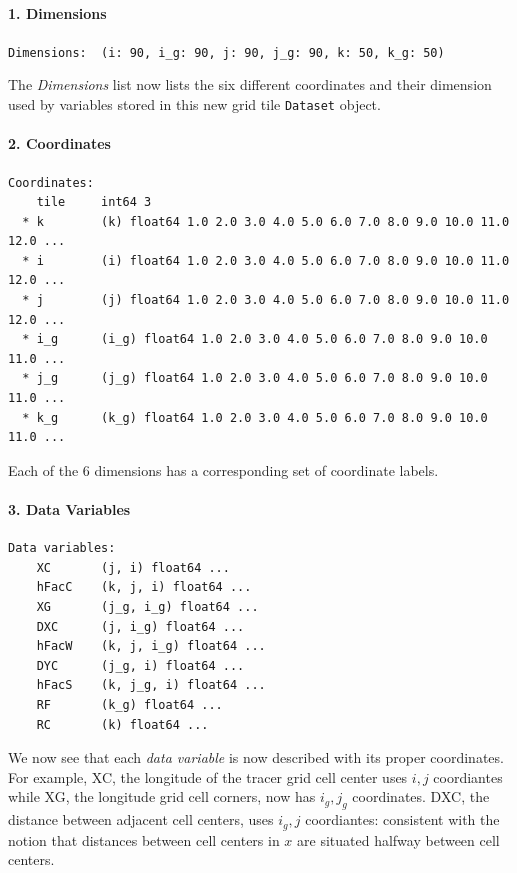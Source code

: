 \documentclass[11pt]{article}
\begin{document}
\paragraph{1. Dimensions}\label{dimensions}

\texttt{Dimensions:\ \ (i:\ 90,\ i\_g:\ 90,\ j:\ 90,\ j\_g:\ 90,\ k:\ 50,\ k\_g:\ 50)}

The \emph{Dimensions} list now lists the six different coordinates and
their dimension used by variables stored in this new grid tile
\texttt{Dataset} object.

\paragraph{2. Coordinates}\label{coordinates}

\begin{verbatim}
Coordinates:
    tile     int64 3
  * k        (k) float64 1.0 2.0 3.0 4.0 5.0 6.0 7.0 8.0 9.0 10.0 11.0 12.0 ...
  * i        (i) float64 1.0 2.0 3.0 4.0 5.0 6.0 7.0 8.0 9.0 10.0 11.0 12.0 ...
  * j        (j) float64 1.0 2.0 3.0 4.0 5.0 6.0 7.0 8.0 9.0 10.0 11.0 12.0 ...
  * i_g      (i_g) float64 1.0 2.0 3.0 4.0 5.0 6.0 7.0 8.0 9.0 10.0 11.0 ...
  * j_g      (j_g) float64 1.0 2.0 3.0 4.0 5.0 6.0 7.0 8.0 9.0 10.0 11.0 ...
  * k_g      (k_g) float64 1.0 2.0 3.0 4.0 5.0 6.0 7.0 8.0 9.0 10.0 11.0 ...
\end{verbatim}

Each of the 6 dimensions has a corresponding set of coordinate labels.

\paragraph{3. Data Variables}\label{data-variables}

\begin{verbatim}
Data variables:
    XC       (j, i) float64 ...
    hFacC    (k, j, i) float64 ...
    XG       (j_g, i_g) float64 ...
    DXC      (j, i_g) float64 ...
    hFacW    (k, j, i_g) float64 ...
    DYC      (j_g, i) float64 ...
    hFacS    (k, j_g, i) float64 ...
    RF       (k_g) float64 ...
    RC       (k) float64 ...
\end{verbatim}

We now see that each \emph{data variable} is now described with its
proper coordinates. For example, XC, the longitude of the tracer grid
cell center uses \(i,j\) coordiantes while XG, the longitude grid cell
corners, now has \(i_g, j_g\) coordinates. DXC, the distance between
adjacent cell centers, uses \(i_g, j\) coordiantes: consistent with the
notion that distances between cell centers in \(x\) are situated halfway
between cell centers.
\end{document}
